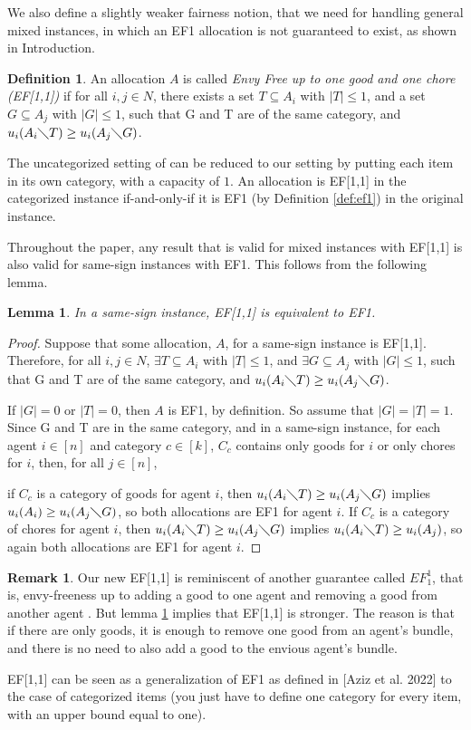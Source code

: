 \documentclass[sigconf]{aamas}
\newtheorem{lemma}[theorem]{Lemma}
\theoremstyle{definition}
\newtheorem{definition}[theorem]{Definition}
\newtheorem{remark}[theorem]{Remark}
\begin{document}
We also define a slightly weaker fairness notion, that we need for handling general mixed instances, in which an EF1 allocation is not guaranteed to exist, as shown in Introduction.

\begin{definition}
\label{def:ef11}
An allocation $A$ is called \textit{Envy Free up to one good and one chore (EF[1,1])} if for all $i,j\in N$, there exists a set $T\subseteq A_i$ with $|T|\leq 1$,
and a set $G\subseteq A_j$ with $|G|\leq 1$,
such that G and T are of the same category,
and 
$u_i(A_i \diagdown T) \geq u_i(A_j \diagdown G)$.
\end{definition}

The uncategorized setting of \citet{aziz2022fair} can be reduced to our setting by putting each item in its own category, with a capacity of $1$.
An allocation is EF[1,1] in the categorized instance if-and-only-if it is EF1 (by Definition \ref{def:ef1}) in the original instance.

Throughout the paper, any result that is valid for mixed instances with EF[1,1] is also valid for same-sign instances with EF1. 
This follows from the following lemma. 
\begin{lemma}
\label{EF1equivalent}
In a same-sign instance, EF[1,1] is equivalent to EF1.
\end{lemma}
\begin{proof}
Suppose that some allocation, $A$, for a same-sign instance is EF[1,1]. Therefore, for all $i,j\in N$, $\exists T\subseteq A_i$ with $|T|\leq 1$,
and $\exists G\subseteq A_j$ with $|G|\leq 1$, such that G and T are of the same category, and
$u_i(A_i \diagdown T) \geq u_i(A_j \diagdown G)$.

If $|G|=0$ or $|T|=0$, then $A$ is EF1, by definition. So assume that $|G|=|T|=1$. 
Since G and T are in the same category, and in a same-sign instance, for each agent $i\in [n]$ and category $c\in [k]$, $C_c$ contains only goods for $i$ or only chores for $i$, then, for all $j\in [n]$, 

if $C_c$ is a category of goods for agent $i$, then $u_i(A_i \diagdown T) \geq u_i(A_j \diagdown G)$ implies 
$u_i(A_i)\geq u_i(A_j \diagdown G)$, 
so both allocations are EF1 for agent $i$.
If $C_c$ is a category of chores for agent $i$, then $u_i(A_i \diagdown T) \geq u_i(A_j \diagdown G)$ implies 
$u_i(A_i \diagdown T)\geq u_i(A_j)$,
so again both allocations are EF1 for agent $i$.
\end{proof}


\begin{remark}
Our new EF[1,1] is reminiscent of another guarantee called $EF_1^1$, that is, envy-freeness up to adding a good to one agent and removing a good from another agent \cite{barman2019proximity}. But lemma \ref{EF1equivalent} implies that EF[1,1] is stronger. The reason is that if there are only goods, it is enough to remove one good from an agent's bundle, and there is no need to also add a good to the envious agent's bundle.

EF[1,1] can be seen as a generalization of EF1 as defined in [Aziz et al. 2022] to the case of categorized items (you just have to define one category for every item, with an upper bound equal to one).
\end{remark}
\end{document}
